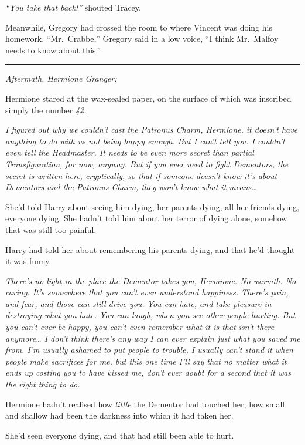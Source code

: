 \emph{``You take that back!''} shouted Tracey.

Meanwhile, Gregory had crossed the room to where Vincent was doing his
homework. ``Mr.~Crabbe,'' Gregory said in a low voice, ``I think
Mr.~Malfoy needs to know about this.''

\begin{center}\rule{3in}{0.4pt}\end{center}

\emph{Aftermath, Hermione Granger:}

Hermione stared at the wax-sealed paper, on the surface of which was
inscribed simply the number \emph{42.}

\emph{I figured out why we couldn't cast the Patronus Charm, Hermione,
it doesn't have anything to do with us not being happy enough. But I
can't tell you. I couldn't even tell the Headmaster. It needs to be even
more secret than partial Transfiguration, for now, anyway. But if you
ever need to fight Dementors, the secret is written here, cryptically,
so that if someone doesn't know it's about Dementors and the Patronus
Charm, they won't know what it means\ldots{}}

She'd told Harry about seeing him dying, her parents dying, all her
friends dying, everyone dying. She hadn't told him about her terror of
dying alone, somehow that was still too painful.

Harry had told her about remembering his parents dying, and that he'd
thought it was funny.

\emph{There's no light in the place the Dementor takes you, Hermione. No
warmth. No caring. It's somewhere that you can't even understand
happiness. There's pain, and fear, and those can still drive you. You
can hate, and take pleasure in destroying what you hate. You can laugh,
when you see other people hurting. But you can't ever be happy, you
can't even remember what it is that isn't there anymore\ldots{} I don't
think there's any way I can ever explain just what you saved me from.
I'm usually ashamed to put people to trouble, I usually can't stand it
when people make sacrifices for me, but this one time I'll say that no
matter what it ends up costing you to have kissed me, don't ever doubt
for a second that it was the right thing to do.}

Hermione hadn't realised how \emph{little} the Dementor had touched her,
how small and shallow had been the darkness into which it had taken her.

She'd seen everyone dying, and that had still been able to hurt.

